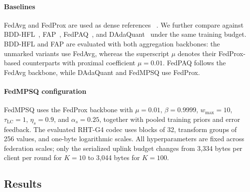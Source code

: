 \documentclass[conference,a4paper]{IEEEtran}
\begin{document}
\paragraph{Baselines}
FedAvg and FedProx are used as dense references
~\cite{mcmahan2017fedavg,li2020fedprox}. We further compare against
BDD-HFL~\cite{song2024bddhfl}, FAP~\cite{wang2025fapdp},
FedPAQ~\cite{reisizadeh2020fedpaq}, and
DAdaQuant~\cite{honig2022dadaquant} under the same training budget.
BDD-HFL and FAP are evaluated with both aggregation backbones: the unmarked
variants use FedAvg, whereas the superscript $\mu$ denotes their FedProx-based
counterparts with proximal coefficient $\mu=0.01$. FedPAQ follows the FedAvg
backbone, while DAdaQuant and FedMPSQ use FedProx.

\paragraph{FedMPSQ configuration}
FedMPSQ uses the FedProx backbone with $\mu=0.01$,
$\beta=0.9999$, $w_{\max}=10$, $\tau_{\mathrm{LC}}=1$,
$\eta_s=0.9$, and $\alpha_s=0.25$, together with pooled training priors and
error feedback. The evaluated RHT-G4 codec uses blocks of 32, transform groups
of 256 values, and one-byte logarithmic scales. All hyperparameters are fixed
across federation scales; only the serialized uplink budget changes from
3,334 bytes per client per round for $K=10$ to 3,044 bytes for $K=100$.

\subsection{Results}
\end{document}
